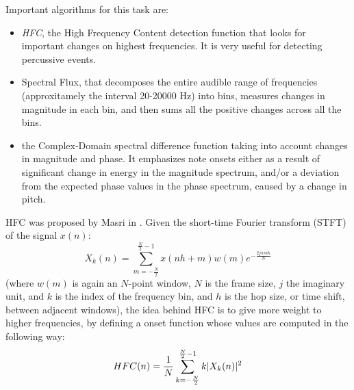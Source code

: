 Important algorithms for this task are:
\begin{itemize}
\item \textit{HFC}, the High Frequency Content detection function that looks for important changes on highest frequencies. It is very useful for detecting percussive events.
\item Spectral Flux, that decomposes the entire audible range of frequencies (approxitamely the interval 20-20000 Hz) into bins, measures changes in magnitude in each bin, and then sums all the positive changes across all the bins.
\item the Complex-Domain spectral difference function \cite{bello04} taking into account changes in magnitude and phase. It emphasizes note onsets either as a result of significant change in energy in the magnitude spectrum, and/or a deviation from the expected phase values in the phase spectrum, caused by a change in pitch.
\end{itemize}  
HFC was proposed by Masri in \cite{masri96}. Given the short-time Fourier transform (STFT) of the signal $x(n)$:\\
\begin{equation}
X_k(n) = \sum\limits_{m=-\frac{N}{2}}^{\frac{N}{2}-1} x(nh + m)w(m)e^{-\frac{2j\pi mk}{N}}
\end{equation}
(where $w(m)$ is again an $N$-point window, $N$ is the frame size, $j$ the imaginary unit, and $k$ is the index of the frequency bin, and $h$ is the hop size, or time shift, between adjacent windows), the idea behind HFC is to give more weight to higher frequencies, by defining a onset function whose values are computed in the following way:
\begin{equation}
HFC(n) = \frac{1}{N}\sum\limits_{k=-\frac{N}{2}}^{\frac{N}{2}-1} k\lvert X_k(n)\rvert^{2}
\end{equation}

